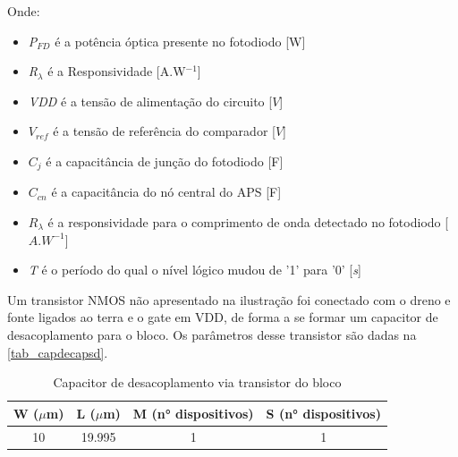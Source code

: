 Onde:

\begin{itemize}

    \item \emph{P$_{FD}$} \'e a pot\^encia \'optica presente no fotodiodo [W]
    \item \emph{R$_\lambda$} \'e a Responsividade [A.W$^{-1}$]
    \item \emph{VDD} \'e a tens\~ao de alimenta{\c c}\~ao do circuito [$V$]
    \item \emph{$V_{ref}$} \'e a tens\~ao de refer\^encia do comparador [$V$]
    \item \emph{$C_j$} \'e a capacit\^ancia de jun{\c c}\~ao do fotodiodo [F]
    \item \emph{$C_{cn}$} \'e a capacit\^ancia do n\'o central do APS [F]
    \item $R_{\lambda}$ \'e a responsividade para o comprimento de onda detectado no fotodiodo [$A.W^{-1}$]
    \item \emph{T} \'e o per\'iodo do qual o n\'ivel l\'ogico mudou de '1' para '0' [\emph{s}]
    
\end{itemize}

Um transistor NMOS n\~ao apresentado na ilustra{\c c}\~ao foi conectado com o dreno e fonte ligados ao terra e o gate em VDD, de forma a se formar um capacitor de desacoplamento para o bloco. Os par\^ametros desse transistor s\~ao dadas na \autoref{tab_capdecapsd}.

\begin{table}[htbp]
\caption{Capacitor de desacoplamento via transistor do bloco \NomeBloco}
\label{tab_capdecapsd}
\centering
\begin{tabular}{cccc}
\toprule
W ($\mu$m)  & L ($\mu$m) & M (n° dispositivos) & S (n° dispositivos)\\
\midrule \midrule
10 & 19.995 & 1 & 1\\
\bottomrule
\end{tabular}
\end{table}
\clearpage

